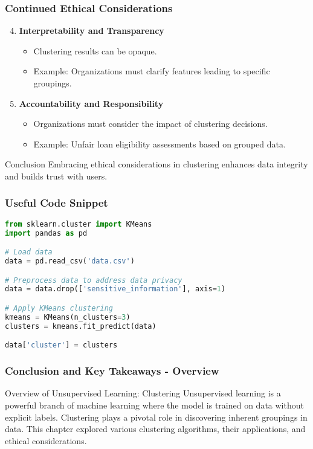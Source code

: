 \documentclass[aspectratio=169]{beamer}
\begin{document}
\begin{frame}[fragile]
    \frametitle{Continued Ethical Considerations}
    \begin{enumerate}
        \setcounter{enumi}{3} %
        \item \textbf{Interpretability and Transparency}
            \begin{itemize}
                \item Clustering results can be opaque.
                \item Example: Organizations must clarify features leading to specific groupings.
            \end{itemize}
            
        \item \textbf{Accountability and Responsibility}
            \begin{itemize}
                \item Organizations must consider the impact of clustering decisions.
                \item Example: Unfair loan eligibility assessments based on grouped data.
            \end{itemize}
    \end{enumerate}

    \begin{block}{Conclusion}
        Embracing ethical considerations in clustering enhances data integrity and builds trust with users.
    \end{block}
\end{frame}

\begin{frame}[fragile]
    \frametitle{Useful Code Snippet}
    \begin{lstlisting}[language=Python]
from sklearn.cluster import KMeans
import pandas as pd

# Load data
data = pd.read_csv('data.csv')

# Preprocess data to address data privacy
data = data.drop(['sensitive_information'], axis=1)

# Apply KMeans clustering
kmeans = KMeans(n_clusters=3)
clusters = kmeans.fit_predict(data)

data['cluster'] = clusters
    \end{lstlisting}
\end{frame}

\begin{frame}[fragile]
  \frametitle{Conclusion and Key Takeaways - Overview}
  \begin{block}{Overview of Unsupervised Learning: Clustering}
    Unsupervised learning is a powerful branch of machine learning where the model is trained on data without explicit labels. Clustering plays a pivotal role in discovering inherent groupings in data. This chapter explored various clustering algorithms, their applications, and ethical considerations.
  \end{block}
\end{frame}
\end{document}
